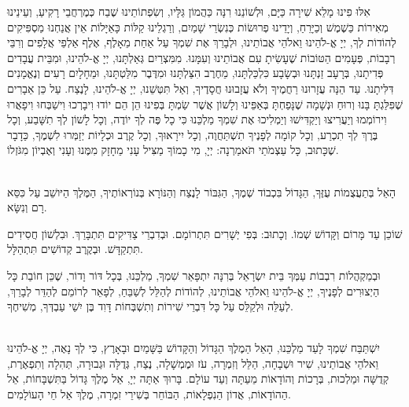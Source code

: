 אִלּוּ פִינוּ מָלֵא שִׁירָה כַּיָּם, וּלְשׁוֹנֵנוּ רִנָּה כַּהֲמוֹן גַּלָּיו, וְשִׂפְתוֹתֵינוּ שֶׁבַח כְּמֶרְחֲבֵי רָקִיעַ, וְעֵינֵינוּ מְאִירוֹת כַּשֶׁמֶשׁ וְכַיָּרֵחַ, וְיָדֵינוּ פְרוּשׂוֹת כְּנִשְׂרֵי שָׁמַיִם, וְרַגְלֵינוּ קַלּוֹת כָּאַיָּלוֹת אֵין אֲנַחְנוּ מַסְפִּיקִים לְהוֹדוֹת לְךָ, יְיָ אֱ-לֹהֵינוּ וֵאלֹהֵי אֲבוֹתֵינוּ, וּלְבָרֵךְ אֶת שִׁמְךָ עַל אַחַת מֵאָלֶף, אֶלֶף אַלְפֵי אֲלָפִים וְרִבֵּי רְבָבוֹת, פְּעָמִים הַטּוֹבוֹת שֶׁעָשִׂיתָ עִם אֲבוֹתֵינוּ וְעִמָּנוּ. מִמִּצְרַיִם גְּאַלְתָּנוּ, יְיָ אֱ-לֹהֵינוּ, וּמִבֵּית עֲבָדִים פְּדִיתָנוּ, בְּרָעָב זַנְתָּנוּ וּבְשָׂבָע כִּלְכַּלְתָּנוּ, מֵחֶרֶב הִצַּלְתָּנוּ וּמִדֶּבֶר מִלַּטְתָּנוּ, וּמֵחָלָיִם רָעִים וְנֶאֱמָנִים דִּלִּיתָנוּ.
עַד הֵנָּה עֲזָרוּנוּ רַחֲמֶיךָ וְלֹא עֲזָבוּנוּ חֲסָדֶיךָ, וְאַל תִּטְּשֵׁנוּ, יְיָ אֱ-לֹהֵינוּ, לָנֶצַח. עַל כֵּן אֵבָרִים שֶׁפִּלַּגְתָּ בָּנוּ וְרוּחַ וּנְשָׁמָה שֶׁנָּפַחְתָּ בְּאַפֵּינוּ וְלָשׁוֹן אֲשֶׁר שַׂמְתָּ בְּפִינוּ הֵן הֵם יוֹדוּ וִיבָרְכוּ וִישַׁבְּחוּ וִיפָאֲרוּ וִירוֹמְמוּ וְיַעֲרִיצוּ וְיַקְדִּישׁוּ וְיַמְלִיכוּ אֶת שִׁמְךָ מַלְכֵּנוּ כִּי כָל פֶּה לְךָ יוֹדֶה, וְכָל לָשׁוֹן לְךָ תִשָּׁבַע, וְכָל בֶּרֶךְ לְךָ תִכְרַע, וְכָל קוֹמָה לְפָנֶיךָ תִשְׁתַּחֲוֶה, וְכָל יִירָאוּךָ, וְכָל קֶרֶב וּכְלָיוֹת יְזַמְּרוּ לִשְׁמֶךָ, כַּדָבָר שֶׁכָּתוּב, כָּל עַצְמֹתַי תֹּאמַרְנָה: יְיָ, מִי כָמוֹךָ מַצִּיל עָנִי מֵחָזָק מִמֶּנוּ וְעָנִי וְאֶבְיוֹן מִגֹּזְלוֹ.

\ \\

הָאֵל בְּתַעֲצֻמוֹת עֻזֶּךָ, הַגָּדוֹל בִּכְבוֹד שְׁמֶךָ, הַגִּבּוֹר לָנֶצַח וְהַנּוֹרָא בְּנוֹרְאוֹתֶיךָ, הַמֶּלֶךְ הַיּושֵׁב עַל כִּסֵּא רָם וְנִשָּׂא.

שׁוֹכֵן עַד מָּרוֹם וְקָּדוֹשׁ שְׁמוֹ. וְכָתוּב: 
בְּפִי יְשָׁרִים תִּתְרוֹמָם. וּבְדִבְרֵי צַדִּיקִים תִּתְבָּרַךְ. וּבִלְשׁוֹן חֲסִידִים תִּתְקַדָּשׁ. וּבְקֶרֶב קְדוֹשִׁים תִּתְהַלָּל. 

וּבְמַקְהֲלוֹת רִבְבוֹת עַמְּךָ בֵּית יִשְׂרָאֵל בְּרִנָּה יִתְפָּאֵר שִׁמְךָ, מַלְכֵּנוּ, בְּכָל דּוֹר וָדוֹר, שֶׁכֵּן חוֹבַת כָּל הַיְצוּרִים לְפָנֶיךָ, יְיָ אֱ-לֹהֵינוּ וֵאלֹהֵי אֲבוֹתֵינוּ, לְהוֹדוֹת לְהַלֵּל לְשַׁבֵּחַ, לְפָאֵר לְרוֹמֵם לְהַדֵּר לְבָרֵךְ, לְעַלֵּה וּלְקַלֵּס עַל כָּל דִּבְרֵי שִׁירוֹת וְתִשְׁבְּחוֹת דָּוִד בֶּן יִשַׁי עַבְדְּךָ, מְשִׁיחֶךָ.

\ \\

יִשְׁתַּבַּח שִׁמְךָ לָעַד מַלְכֵּנוּ, הָאֵל הַמֶלֶךְ הַגָּדוֹל וְהַקָּדוֹשׁ בַּשָּׁמַיִם וּבָאָרֶץ, כִּי לְךָ נָאֶה, יְיָ אֱ-לֹהֵינוּ וֵאלֹהֵי אֲבוֹתֵינוּ, שִׁיר וּשְׁבָחָה, הַלֵּל וְזִמְרָה, עֹז וּמֶמְשָׁלָה, נֶצַח, גְּדֻלָּה וּגְבוּרָה, תְּהִלָה וְתִפְאֶרֶת, קְדֻשָּׁה וּמַלְכוּת, בְּרָכוֹת וְהוֹדָאוֹת מֵעַתָּה וְעַד עוֹלָם. בָּרוּךְ אַתָּה יְיָ, אֵל מֶלֶךְ גָּדוֹל בַּתִּשְׁבָּחוֹת, אֵל הַהוֹדָאוֹת, אֲדוֹן הַנִפְלָאוֹת, הַבּוֹחֵר בְּשִׁירֵי זִמְרָה, מֶלֶךְ אֵל חֵי הָעוֹלָמִים.

